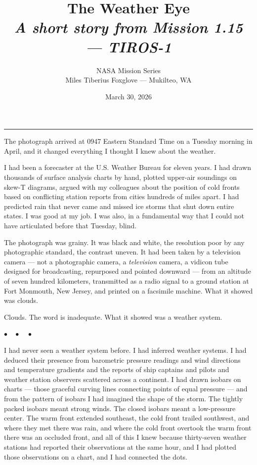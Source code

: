 \documentclass[12pt, letterpaper]{article}
\title{\Huge\textbf{The Weather Eye}\\[0.5em]\large\textit{A short story from Mission 1.15 --- TIROS-1}}
\author{NASA Mission Series\\[0.3em]\small Miles Tiberius Foxglove --- Mukilteo, WA}
\date{March 30, 2026}
\begin{document}
\maketitle
\thispagestyle{empty}

\vspace{1em}
\noindent\rule{\textwidth}{0.4pt}
\vspace{1em}

\noindent The photograph arrived at 0947 Eastern Standard Time on a Tuesday morning in April, and it changed everything I thought I knew about the weather.

I had been a forecaster at the U.S. Weather Bureau for eleven years. I had drawn thousands of surface analysis charts by hand, plotted upper-air soundings on skew-T diagrams, argued with my colleagues about the position of cold fronts based on conflicting station reports from cities hundreds of miles apart. I had predicted rain that never came and missed ice storms that shut down entire states. I was good at my job. I was also, in a fundamental way that I could not have articulated before that Tuesday, blind.

The photograph was grainy. It was black and white, the resolution poor by any photographic standard, the contrast uneven. It had been taken by a television camera --- not a photographic camera, a \emph{television} camera, a vidicon tube designed for broadcasting, repurposed and pointed downward --- from an altitude of seven hundred kilometers, transmitted as a radio signal to a ground station at Fort Monmouth, New Jersey, and printed on a facsimile machine. What it showed was clouds.

Clouds. The word is inadequate. What it showed was a weather system.

\begin{center}
$\bullet\quad\bullet\quad\bullet$
\end{center}

I had never seen a weather system before. I had inferred weather systems. I had deduced their presence from barometric pressure readings and wind directions and temperature gradients and the reports of ship captains and pilots and weather station observers scattered across a continent. I had drawn isobars on charts --- those graceful curving lines connecting points of equal pressure --- and from the pattern of isobars I had imagined the shape of the storm. The tightly packed isobars meant strong winds. The closed isobars meant a low-pressure center. The warm front extended southeast, the cold front trailed southwest, and where they met there was rain, and where the cold front overtook the warm front there was an occluded front, and all of this I knew because thirty-seven weather stations had reported their observations at the same hour, and I had plotted those observations on a chart, and I had connected the dots.
\end{document}
